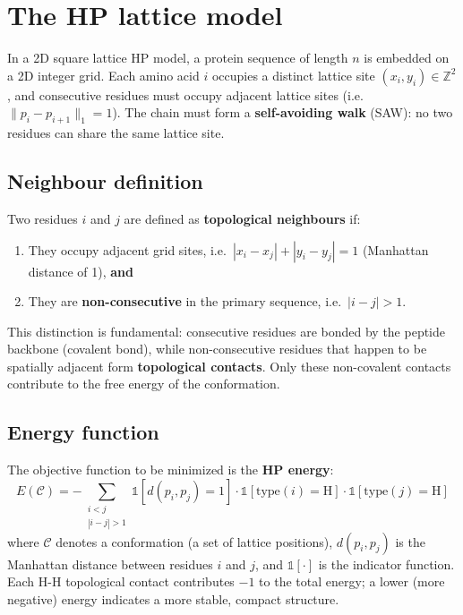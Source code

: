 \section{The HP lattice model}
\label{cap2:sec_hp_model}

In a 2D square lattice HP model, a protein sequence of length $n$ is embedded on a 2D integer grid. Each amino acid $i$ occupies a distinct lattice site $(x_i, y_i) \in \mathbb{Z}^2$, and consecutive residues must occupy adjacent lattice sites (i.e.\ $\|p_i - p_{i+1}\|_1 = 1$). The chain must form a \textbf{self-avoiding walk} (SAW): no two residues can share the same lattice site.

\subsection{Neighbour definition}
\label{cap2:subsec_neighbours}

Two residues $i$ and $j$ are defined as \textbf{topological neighbours} if:
\begin{enumerate}
    \item They occupy adjacent grid sites, i.e.\ $|x_i - x_j| + |y_i - y_j| = 1$ (Manhattan distance of 1), \textbf{and}
    \item They are \textbf{non-consecutive} in the primary sequence, i.e.\ $|i - j| > 1$.
\end{enumerate}
This distinction is fundamental: consecutive residues are bonded by the peptide backbone (covalent bond), while non-consecutive residues that happen to be spatially adjacent form \textbf{topological contacts}. Only these non-covalent contacts contribute to the free energy of the conformation.

\subsection{Energy function}
\label{cap2:subsec_energy}

The objective function to be minimized is the \textbf{HP energy}:
\begin{equation}
    E(\mathcal{C}) = -\sum_{\substack{i < j \\ |i-j|>1}} \mathbb{1}[d(p_i, p_j) = 1] \cdot \mathbb{1}[\text{type}(i) = \text{H}] \cdot \mathbb{1}[\text{type}(j) = \text{H}]
    \label{eq:hp_energy}
\end{equation}
where $\mathcal{C}$ denotes a conformation (a set of lattice positions), $d(p_i, p_j)$ is the Manhattan distance between residues $i$ and $j$, and $\mathbb{1}[\cdot]$ is the indicator function. Each H-H topological contact contributes $-1$ to the total energy; a lower (more negative) energy indicates a more stable, compact structure.



